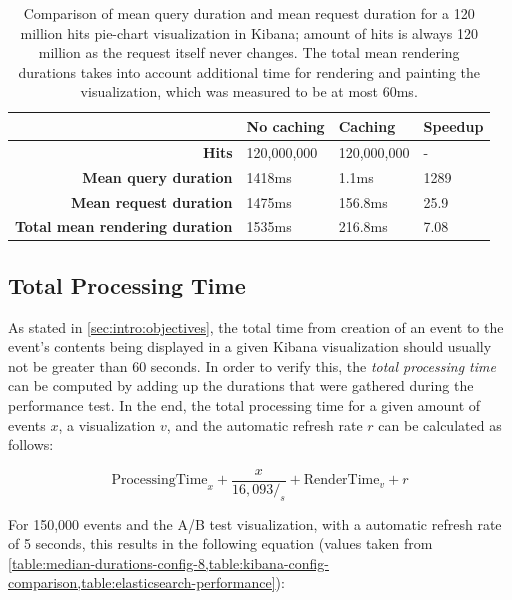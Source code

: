 \begin{table}
\caption[Comparison of mean query duration and mean request duration for a 120 million hits pie-chart visualization in Kibana]{
Comparison of mean query duration and mean request duration for a 120 million hits pie-chart visualization in Kibana; amount of hits is always 120 million as the request itself never changes. The total mean rendering durations takes into account additional time for rendering and painting the visualization, which was measured to be at most 60ms.}
\label{table:kibana-config-comparison}
\centering
\begin{tabular}{r|l|l|l}
& \textbf{No caching}                                      & \textbf{Caching} & \textbf{Speedup} \\ \hline
\textbf{Hits} & 120,000,000 & 120,000,000 & - \\ \hline
\textbf{Mean query duration} & 1418ms & 1.1ms & 1289 \\ \hline
\textbf{Mean request duration} & 1475ms & 156.8ms & 25.9 \\ \hline
\textbf{Total mean rendering duration} & 1535ms & 216.8ms & 7.08 \\

\end{tabular}
\end{table}


\subsection{Total Processing Time}
\label{subsec:evaluation:performance:total-processing-time}

As stated in \cref{sec:intro:objectives}, the total time from creation of an event to the event's contents being displayed in a given Kibana visualization should usually not be greater than 60 seconds.
In order to verify this, the \emph{total processing time} can be computed by adding up the durations that were gathered during the performance test.
In the end, the total processing time for a given amount of events $x$, a visualization $v$, and the automatic refresh rate $r$ can be calculated as follows:

$$ \text{ProcessingTime}_x + \frac{x}{16,093/_s} + \text{RenderTime}_v + r$$

For 150,000 events and the A/B test visualization, with a automatic refresh rate of 5 seconds, this results in the following equation (values taken from \cref{table:median-durations-config-8,table:kibana-config-comparison,table:elasticsearch-performance}):

